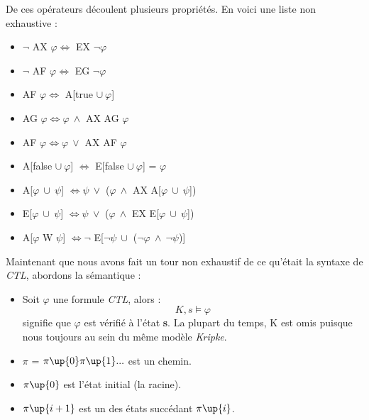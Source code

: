 \documentclass[runningheads,a4paper]{llncs}
\begin{document}
\noindent De ces opérateurs découlent plusieurs propriétés. En voici une liste non exhaustive : 
\begin{itemize}
\item $\lnot$ AX $\varphi \Leftrightarrow $ EX $\lnot \varphi$
\item $\lnot$ AF $\varphi \Leftrightarrow $ EG $\lnot \varphi$
\item AF $\varphi \Leftrightarrow $ A[true $\cup \ \varphi$]
\item AG $\varphi \Leftrightarrow \varphi \ \land$ AX AG $\varphi$
\item AF $\varphi \Leftrightarrow \varphi \ \lor$ AX AF $\varphi$
\item A[false $\cup \ \varphi$] $ \Leftrightarrow $ E[false $\cup \ \varphi$] = $\varphi$
\item A[$\varphi \ \cup \ \psi$] $ \Leftrightarrow \psi \ \lor$ ($\varphi \ \land$ AX A[$\varphi \ \cup \ \psi$])
\item E[$\varphi \ \cup \ \psi$] $ \Leftrightarrow \psi \ \lor$ ($\varphi \ \land$ EX E[$\varphi \ \cup \ \psi$])
\item A[$\varphi$ W $\psi$] $ \Leftrightarrow \lnot$ E[$\lnot \psi \ \cup$ ($\lnot \varphi \ \land \ \lnot \psi$)]\\
\end{itemize}

\noindent Maintenant que nous avons fait un tour non exhaustif de ce qu'était la syntaxe de \textit{CTL}, abordons la sémantique :  \\

\begin{itemize}
\item Soit $\varphi$ une formule \textit{CTL}, alors : $$K, s \vDash \varphi$$ signifie que $\varphi$ est vérifié à l'état \textbf{s}. La plupart du temps, K est omis puisque nous toujours au sein du même modèle \textit{Kripke}.\\
\item $\pi$ = $\pi\up{0} \pi\up{1} ...$ est un chemin.
\item $\pi\up{0}$ est l'état initial (la racine).
\item $\pi\up{i+1}$ est un des états succédant $\pi\up{i}$.\\
\end{itemize}
\end{document}
